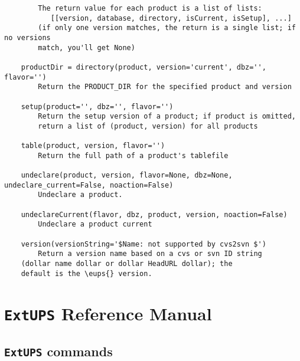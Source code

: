 \documentclass{article}
\newcommand{\code}[1]{\texttt{#1}}
\newcommand{\eups}{\code{ExtUPS}}
\begin{document}
\begin{verbatim}
        The return value for each product is a list of lists:
           [[version, database, directory, isCurrent, isSetup], ...]
        (if only one version matches, the return is a single list; if no versions
        match, you'll get None)
    
    productDir = directory(product, version='current', dbz='', flavor='')
        Return the PRODUCT_DIR for the specified product and version
    
    setup(product='', dbz='', flavor='')
        Return the setup version of a product; if product is omitted,
        return a list of (product, version) for all products
    
    table(product, version, flavor='')
        Return the full path of a product's tablefile
    
    undeclare(product, version, flavor=None, dbz=None, undeclare_current=False, noaction=False)
        Undeclare a product.
    
    undeclareCurrent(flavor, dbz, product, version, noaction=False)
        Undeclare a product current
    
    version(versionString='$Name: not supported by cvs2svn $')
        Return a version name based on a cvs or svn ID string
	(dollar name dollar or dollar HeadURL dollar); the
	default is the \eups{} version.
\end{verbatim}

\appendix

\section{\eups{} Reference Manual}

\subsection{\eups{} commands}
\end{document}
